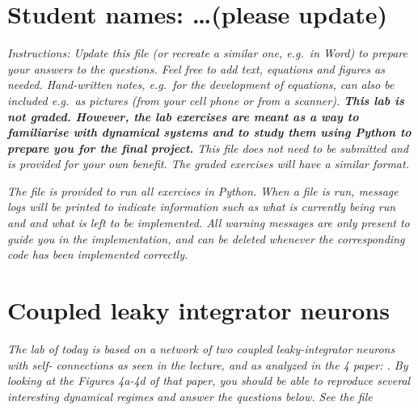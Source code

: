 \documentclass{cmc}
\begin{document}
\pagestyle{fancy}
 

\section*{Student names: \ldots (please update)}

\textit{Instructions: Update this file (or recreate a similar one, e.g.\ in
  Word) to prepare your answers to the questions. Feel free to add text,
  equations and figures as needed. Hand-written notes, e.g.\ for the development
  of equations, can also be included e.g.\ as pictures (from your cell phone or
  from a scanner).  \textbf{This lab is not graded. However, the lab exercises
    are meant as a way to familiarise with dynamical systems and to study them
    using Python to prepare you for the final project.} This file does not need
  to be submitted and is provided for your own benefit. The graded exercises
  will have a similar format.}

\textit{The file  is provided to run all exercises in Python.
  When a file is run, message logs will be printed to indicate information such
  as what is currently being run and and what is left to be implemented. All
  warning messages are only present to guide you in the implementation, and can
  be deleted whenever the corresponding code has been implemented correctly.}


\section*{Coupled leaky integrator neurons}

\textit{The lab of today is based on a network of two coupled leaky-integrator
  neurons with self- connections as seen in the lecture, and as analyzed in the
  4 paper:
  . By looking at the Figures
  4a-4d of that paper, you should be able to reproduce several interesting
  dynamical regimes and answer the questions below. See the file
  }
\end{document}
